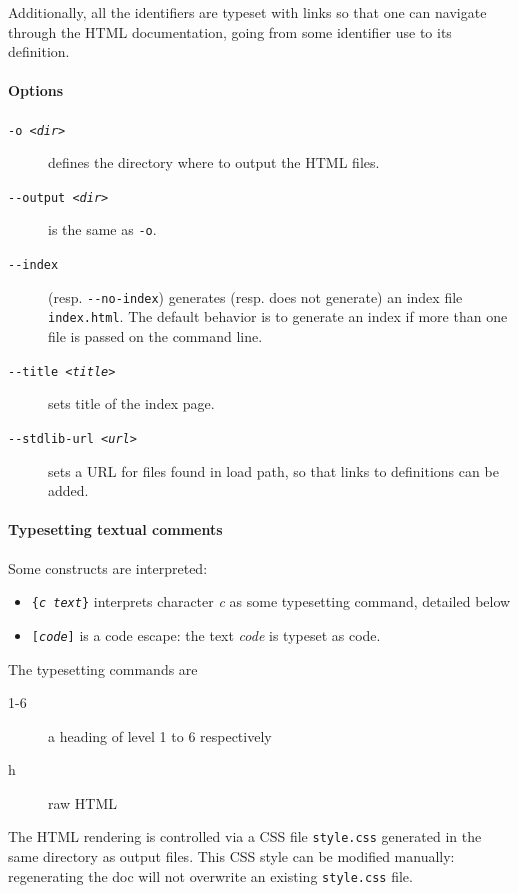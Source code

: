 Additionally, all the \why identifiers are typeset with links so that
one can navigate through the HTML documentation, going from some
identifier use to its definition.

\paragraph{Options}

\begin{description}
\item[\texttt{-o \textsl{<dir>}}] defines the directory where to
  output the HTML files.
\item[\texttt{-{}-output \textsl{<dir>}}] is the same as \verb|-o|.
\item[\texttt{-{}-index}] (resp. \verb|--no-index|) generates
  (resp. does not generate) an index file \texttt{index.html}.
  The default behavior is to generate an index if more than one file
  is passed on the command line.
\item[\texttt{-{}-title \textsl{<title>}}] sets title of the
  index page.
\item[\texttt{-{}-stdlib-url \textsl{<url>}}] sets a URL for files
  found in load path, so that links to definitions can be added.
\end{description}

\paragraph{Typesetting textual comments}

Some constructs are interpreted:
\begin{itemize}
\item \texttt{\{\textsl{c text}\}} interprets character \textsl{c} as
  some typesetting command, detailed below
\item \texttt{[\textsl{code}]} is a code escape: the text
  \textsl{code} is typeset as \why code.
\end{itemize}

The typesetting commands are
\begin{description}
\item[1-6] a heading of level 1 to 6 respectively
\item[h] raw HTML
\end{description}

The HTML rendering is controlled via a CSS file \verb|style.css|
generated in the same directory as output files. This CSS style can be
modified manually: regenerating the doc will not overwrite an existing
\verb|style.css| file.



